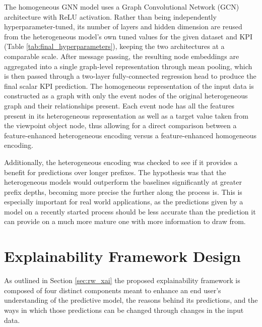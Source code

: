         The homogeneous GNN model uses a Graph Convolutional Network (GCN) \cite{kipf2017} architecture with ReLU activation. Rather than being independently hyperparameter-tuned, its number of layers and hidden dimension are reused from the heterogeneous model's own tuned values for the given dataset and KPI (Table \ref{tab:final_hyperparameters}), keeping the two architectures at a comparable scale. After message passing, the resulting node embeddings are aggregated into a single graph-level representation through mean pooling, which is then passed through a two-layer fully-connected regression head to produce the final scalar KPI prediction. The homogeneous representation of the input data is constructed as a graph with only the event nodes of the original heterogeneous graph and their relationships present. Each event node has all the features present in its heterogeneous representation as well as a target value taken from the viewpoint object node, thus allowing for a direct comparison between a feature-enhanced heterogeneous encoding versus a feature-enhanced homogeneous encoding.

        Additionally, the heterogeneous encoding was checked to see if it provides a benefit for predictions over longer prefixes. The hypothesis was that the heterogeneous models would outperform the baselines significantly at greater prefix depths, becoming more precise the further along the process is. This is especially important for real world applications, as the predictions given by a model on a recently started process should be less accurate than the prediction it can provide on a much more mature one with more information to draw from.

\section{Explainability Framework Design}
    As outlined in Section \ref{sec:rw_xai} the proposed explainability framework is composed of four distinct components meant to enhance an end user's understanding of the predictive model, the reasons behind its predictions, and the ways in which those predictions can be changed through changes in the input data.

